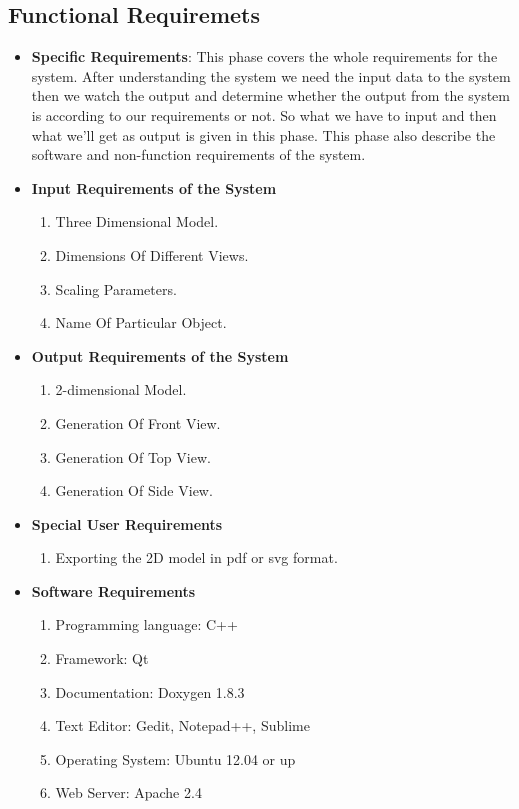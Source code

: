 \subsection{Functional Requiremets}
\begin{itemize}
\item {\bf Specific Requirements}: This phase covers the whole requirements 
for the system. After understanding the system we need the input data 
to the system then we watch the output and determine whether the output 
from the system is according to our requirements or not. So what we have 
to input and then what we’ll get as output is given in this phase. This 
phase also describe the software and non-function requirements of the 
system.
\item {\bf Input Requirements of the System}
\begin{enumerate} 
\item Three Dimensional Model.
\item Dimensions Of Different Views.
\item Scaling Parameters.
\item Name Of Particular Object.
\end{enumerate}
\vskip 0.5cm
\item {\bf Output Requirements of the System}
\begin{enumerate} 
\item 2-dimensional Model.
\item Generation Of Front View.
\item Generation Of Top View.
\item Generation Of Side View.
\end{enumerate}
\vskip 0.5cm
\item {\bf Special User Requirements}
\begin{enumerate} 
\item Exporting the 2D model in pdf or svg format.
\end{enumerate}
\vskip 0.5cm
\item {\bf Software Requirements}
\begin{enumerate} 
\item Programming language: C++
\item Framework: Qt
\item Documentation: Doxygen 1.8.3
\item Text Editor: Gedit, Notepad++, Sublime
\item Operating System: Ubuntu 12.04 or up
\item Web Server: Apache 2.4
\end{enumerate}
\end{itemize}
